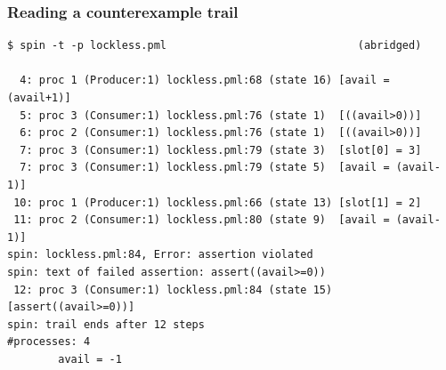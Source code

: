 \begin{frame}[fragile]
  \frametitle{Reading a counterexample trail} \small

\begin{lstlisting}[style=shell]
$ spin -t -p lockless.pml                              (abridged)

  4: proc 1 (Producer:1) lockless.pml:68 (state 16) [avail = (avail+1)]
  5: proc 3 (Consumer:1) lockless.pml:76 (state 1)  [((avail>0))]
  6: proc 2 (Consumer:1) lockless.pml:76 (state 1)  [((avail>0))]
  7: proc 3 (Consumer:1) lockless.pml:79 (state 3)  [slot[0] = 3]
  7: proc 3 (Consumer:1) lockless.pml:79 (state 5)  [avail = (avail-1)]
 10: proc 1 (Producer:1) lockless.pml:66 (state 13) [slot[1] = 2]
 11: proc 2 (Consumer:1) lockless.pml:80 (state 9)  [avail = (avail-1)]
spin: lockless.pml:84, Error: assertion violated
spin: text of failed assertion: assert((avail>=0))
 12: proc 3 (Consumer:1) lockless.pml:84 (state 15) [assert((avail>=0))]
spin: trail ends after 12 steps
#processes: 4
        avail = -1
\end{lstlisting}

\end{frame}
